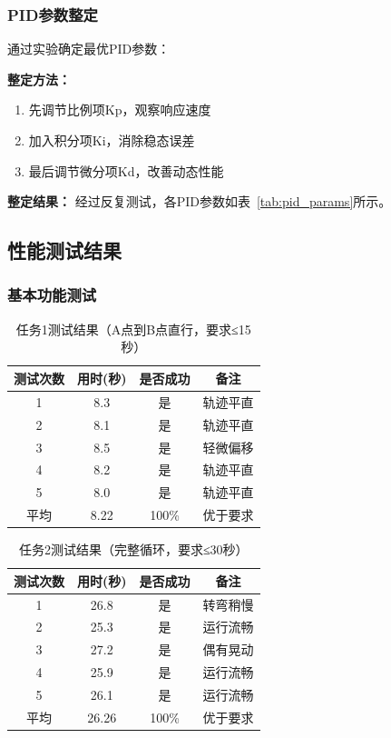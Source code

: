 \documentclass[UTF8]{ctexart}
\begin{document}
\subsubsection{PID参数整定}

通过实验确定最优PID参数：

\textbf{整定方法：}
\begin{enumerate}
    \item 先调节比例项Kp，观察响应速度
    \item 加入积分项Ki，消除稳态误差
    \item 最后调节微分项Kd，改善动态性能
\end{enumerate}

\textbf{整定结果：} 经过反复测试，各PID参数如表~\ref{tab:pid_params}所示。

\subsection{性能测试结果}

\subsubsection{基本功能测试}

\begin{table}[H]
    \centering
    \caption{任务1测试结果（A点到B点直行，要求≤15秒）}
    \label{tab:task1_result}
    \begin{tabular}{cccc}
        \toprule
        测试次数 & 用时(秒) & 是否成功 & 备注 \\
        \midrule
        1 & 8.3 & 是 & 轨迹平直 \\
        2 & 8.1 & 是 & 轨迹平直 \\
        3 & 8.5 & 是 & 轻微偏移 \\
        4 & 8.2 & 是 & 轨迹平直 \\
        5 & 8.0 & 是 & 轨迹平直 \\
        \midrule
        平均 & 8.22 & 100\% & 优于要求 \\
        \bottomrule
    \end{tabular}
\end{table}

\begin{table}[H]
    \centering
    \caption{任务2测试结果（完整循环，要求≤30秒）}
    \label{tab:task2_result}
    \begin{tabular}{cccc}
        \toprule
        测试次数 & 用时(秒) & 是否成功 & 备注 \\
        \midrule
        1 & 26.8 & 是 & 转弯稍慢 \\
        2 & 25.3 & 是 & 运行流畅 \\
        3 & 27.2 & 是 & 偶有晃动 \\
        4 & 25.9 & 是 & 运行流畅 \\
        5 & 26.1 & 是 & 运行流畅 \\
        \midrule
        平均 & 26.26 & 100\% & 优于要求 \\
        \bottomrule
    \end{tabular}
\end{table}
\end{document}
